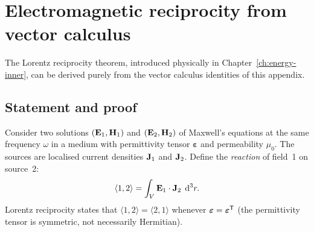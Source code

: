 \section{Electromagnetic reciprocity from vector calculus}
\label{sec:reciprocity-vector}

The Lorentz reciprocity theorem, introduced physically in
Chapter~\ref{ch:energy-inner}, can be derived purely from the vector
calculus identities of this appendix.

\subsection{Statement and proof}
\label{ssec:reciprocity-proof}

Consider two solutions $(\mathbf{E}_1, \mathbf{H}_1)$ and $(\mathbf{E}_2, \mathbf{H}_2)$ of
Maxwell's equations at the same frequency $\omega$ in a medium with
permittivity tensor $\boldsymbol{\varepsilon}$ and permeability
$\mu_0$. The sources are localised current densities $\mathbf{J}_1$ and
$\mathbf{J}_2$. Define the \emph{reaction} of field~1 on source~2:
\begin{equation}
 \langle 1, 2 \rangle = \int_V \mathbf{E}_1 \cdot \mathbf{J}_2\;\mathop{}\!\mathrm{d}^3 r.
 \label{eq:reaction-app}
\end{equation}
Lorentz reciprocity states that
$\langle 1, 2 \rangle = \langle 2, 1 \rangle$ whenever
$\boldsymbol{\varepsilon} = \boldsymbol{\varepsilon}^{\mathsf{T}}$
(the permittivity tensor is symmetric, not necessarily Hermitian).

